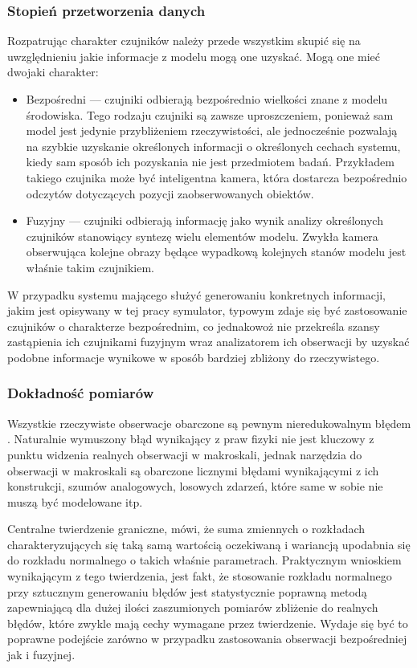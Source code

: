 \subsubsection{Stopień przetworzenia danych}
\par{
Rozpatrując charakter czujników należy przede wszystkim skupić się na uwzględnieniu jakie informacje z modelu mogą one uzyskać. Mogą one mieć dwojaki charakter:
\begin{itemize}
\item Bezpośredni --- czujniki odbierają bezpośrednio wielkości znane z modelu środowiska. Tego rodzaju czujniki są zawsze uproszczeniem, ponieważ sam model jest jedynie przybliżeniem rzeczywistości, ale jednocześnie pozwalają na szybkie uzyskanie określonych informacji o określonych cechach systemu, kiedy sam sposób ich pozyskania nie jest przedmiotem badań. Przykładem takiego czujnika może być inteligentna kamera, która dostarcza bezpośrednio odczytów dotyczących pozycji zaobserwowanych obiektów.
\item Fuzyjny --- czujniki odbierają informację jako wynik analizy określonych czujników stanowiący syntezę wielu elementów modelu. Zwykła kamera obserwująca kolejne obrazy będące wypadkową kolejnych stanów modelu jest właśnie takim czujnikiem.
\end{itemize}
W przypadku systemu mającego służyć generowaniu konkretnych informacji, jakim jest opisywany w tej pracy symulator, typowym zdaje się być zastosowanie czujników o charakterze bezpośrednim, co jednakowoż nie przekreśla szansy zastąpienia ich czujnikami fuzyjnym wraz analizatorem ich obserwacji by uzyskać podobne informacje wynikowe w sposób bardziej zbliżony do rzeczywistego.

\subsubsection{Dokładność pomiarów}
\par{
Wszystkie rzeczywiste obserwacje obarczone są pewnym nieredukowalnym błędem \cite{Heisenberg}. Naturalnie wymuszony błąd wynikający z praw fizyki nie jest kluczowy z punktu widzenia realnych obserwacji w makroskali, jednak narzędzia do obserwacji w makroskali są obarczone licznymi błędami wynikającymi z ich konstrukcji, szumów analogowych, losowych zdarzeń, które same w sobie nie muszą być modelowane itp.
}
\par{
Centralne twierdzenie graniczne, mówi, że suma zmiennych o rozkładach charakteryzujących się taką samą wartością oczekiwaną i wariancją upodabnia się do rozkładu normalnego o takich właśnie parametrach. Praktycznym wnioskiem wynikającym z tego twierdzenia, jest fakt, że stosowanie rozkładu normalnego przy sztucznym generowaniu błędów jest statystycznie poprawną metodą zapewniającą dla dużej ilości zaszumionych pomiarów zbliżenie do realnych błędów, które zwykle mają cechy wymagane przez twierdzenie. Wydaje się być to poprawne podejście zarówno w przypadku zastosowania obserwacji bezpośredniej jak i fuzyjnej.
}

}
